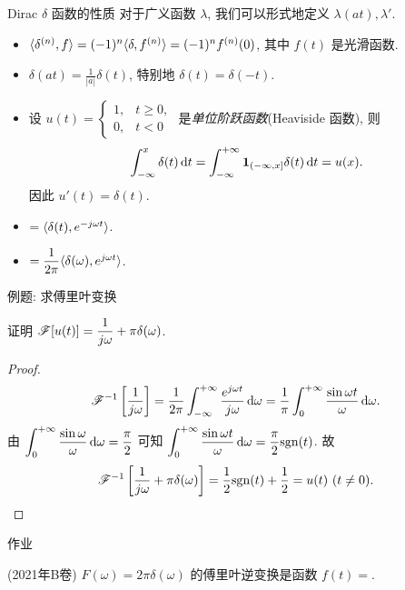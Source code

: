 \begin{frame}{Dirac $\delta$ 函数的性质}
对于广义函数 $\lambda$, 我们可以形式地定义 $\lambda(at),\lambda'$.
\onslide<+->
\begin{itemize}
\item $\langle{\delta^{(n)},f}\rangle=(-1)^n\langle{\delta,f^{(n)}}\rangle=(-1)^nf^{(n)}(0)$, 其中 $f(t)$ 是光滑函数.
\item $\delta(at)=\frac1{|a|}\delta(t)$, 特别地 $\delta(t)=\delta(-t)$.
\item 设 $u(t)=\begin{cases}1,&t\ge0,\\0,&t<0\end{cases}$ 是\emph{单位阶跃函数}(Heaviside 函数), 则
\[\int_{-\infty}^x\delta(t)\,\mathrm{d} t=\int_{-\infty}^{+\infty}\textbf{1}_{(-\infty,x]}\delta(t)\,\mathrm{d} t=u(x).\]
因此 $u'(t)=\delta(t)$.
\item \abox{$\msf[\delta(t)]$}$=\langle{\delta(t),e^{-j\omega t}}\rangle$.
\item{}$=\dfrac1{2\pi}\langle{\delta(\omega),e^{j\omega t}}\rangle$.
\end{itemize}
\end{frame}


\begin{frame}{例题: 求傅里叶变换}
\begin{example}
证明 \alert{$\mathscr{F}[u(t)]=\dfrac1{j\omega}+\pi\delta(\omega)$}.
\end{example}
\begin{proof}
\[\mathscr{F}^{-1}\left[\frac1{j\omega}\right]
=\frac1{2\pi}\int_{-\infty}^{+\infty}\frac{e^{j\omega t}}{j\omega} \,\mathrm{d}\omega
=\frac1\pi\int_0^{+\infty}\frac{\sin{\omega t}}{\omega} \,\mathrm{d}\omega.\]
\onslide<+->
由 $\displaystyle\int_0^{+\infty}\frac{\sin\omega}\omega \,\mathrm{d}\omega=\dfrac\pi2$
可知 $\displaystyle\int_0^{+\infty}\frac{\sin{\omega t}}\omega \,\mathrm{d}\omega=\frac\pi2{\mathrm{sgn}}(t)$.
\onslide<+->
故
\[\mathscr{F}^{-1} \left[\frac1{j\omega}+\pi\delta(\omega)\right]
=\frac12{\mathrm{sgn}}(t)+\frac12=u(t)\ (t\neq 0).\qedhere\]
\end{proof}
\end{frame}

{
\homework
\begin{frame}[<*>]{作业}
  \begin{homeworks}
    \item(2021年B卷) $F(\omega)=2\pi\delta(\omega)$ 的傅里叶逆变换是函数 $f(t)=$\fillblank{}.
  \end{homeworks}
\end{frame}
}
